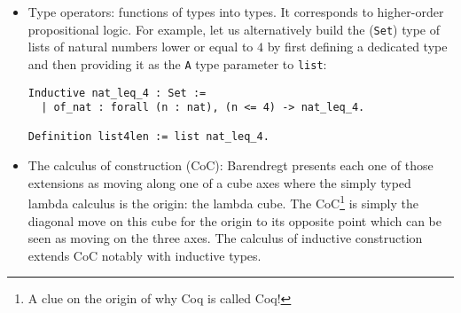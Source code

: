 \documentclass{article}
\newcounter{example}[section]
\begin{document}
\begin{itemize}
\begin{itemize}
                    \item Type operators: functions of types into types. It corresponds to higher-order propositional logic. For example, let us alternatively build the (\texttt{Set}) type of lists of natural numbers lower or equal to $4$ by first defining a dedicated type and then providing it as the \texttt{A} type parameter to \texttt{list}:
                    \begin{verbatim}Inductive nat_leq_4 : Set :=
  | of_nat : forall (n : nat), (n <= 4) -> nat_leq_4.

Definition list4len := list nat_leq_4.\end{verbatim}

                    \item The calculus of construction (CoC): Barendregt presents each one of those extensions as moving along one of a cube axes where the simply typed lambda calculus is the origin: the lambda cube. The CoC\footnote{A clue on the origin of why Coq is called Coq!} is simply the diagonal move on this cube for the origin to its opposite point which can be seen as moving on the three axes. The calculus of inductive construction extends CoC notably with inductive types.
                    
                \end{itemize}
        \end{itemize}
\end{document}
